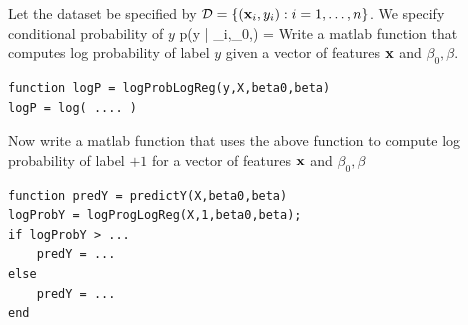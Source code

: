 \documentclass{article}
\begin{document}
\newproblem{1pt}
Let the dataset be specified by $\mathcal{D} = \left\{ (\mathbf{x}_i,y_i):i=1,\dots,n \right\}$. We specify conditional probability of $y$
\BEQ \label{eq:plr}
p(y | \xx_i,\beta_0,\beta) = 
\EEQ
Write a matlab function that computes log probability of label $y$ given a vector of features $\mathbf{x}$ and $\beta_0,\beta$.
\begin{verbatim}
function logP = logProbLogReg(y,X,beta0,beta)
logP = log( .... )
\end{verbatim}
Now write a matlab function that uses the above function to compute log probability of label $+1$ for a vector of features $\mathbf{x}$ and $\beta_0,\beta$
\begin{verbatim}
function predY = predictY(X,beta0,beta)
logProbY = logProgLogReg(X,1,beta0,beta);
if logProbY > ...
    predY = ...
else
    predY = ...
end
\end{verbatim}
\end{document}
